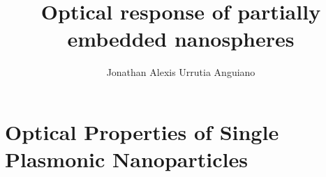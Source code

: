\documentclass[11pt]{Latex/Classes/PhDthesisPSnPDF}
\author{Jonathan Alexis Urrutia Anguiano}
\title{Optical response of partially embedded nanospheres}
\begin{document}
%
\maketitle
\frontmatter

%
%
%


%
\setcounter{secnumdepth}{3} %
\setcounter{tocdepth}{3}    %

\tableofcontents            %



\mainmatter

\def\baselinestretch{1}                   %




\chapter{Optical Properties of Single Plasmonic Nanoparticles}
\label{chapter:OpticalProperties}
\end{document}
